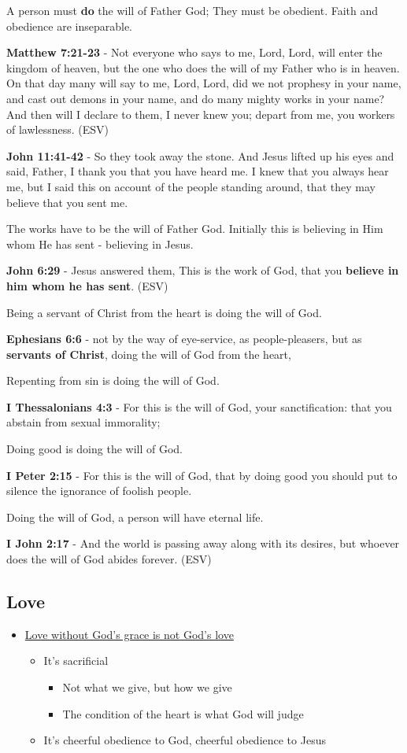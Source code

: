 \documentclass[11pt]{article}
\begin{document}
A person must \textbf{do} the will of Father God; They must be obedient.
Faith and obedience are inseparable.

\textbf{Matthew 7:21-23} - Not everyone who says to me, Lord, Lord, will enter the kingdom of heaven, but the one who does the will of my Father who is in heaven. On that day many will say to me, Lord, Lord, did we not prophesy in your name, and cast out demons in your name, and do many mighty works in your name? And then will I declare to them, I never knew you; depart from me, you workers of lawlessness. (ESV)

\textbf{John 11:41-42} - So they took away the stone. And Jesus lifted up his eyes and said, Father, I thank you that you have heard me. I knew that you always hear me, but I said this on account of the people standing around, that they may believe that you sent me.

The works have to be the will of Father God. Initially this is believing in Him whom He has sent - believing in Jesus.

\textbf{John 6:29} - Jesus answered them, This is the work of God, that you \textbf{believe in him whom he has sent}. (ESV)

Being a servant of Christ from the heart is doing the will of God.

\textbf{Ephesians 6:6} - not by the way of eye-service, as people-pleasers, but as \textbf{servants of Christ}, doing the will of God from the heart,

Repenting from sin is doing the will of God.

\textbf{I Thessalonians 4:3} - For this is the will of God, your sanctification: that you abstain from sexual immorality;

Doing good is doing the will of God.

\textbf{I Peter 2:15} - For this is the will of God, that by doing good you should put to silence the ignorance of foolish people.

Doing the will of God, a person will have eternal life.

\textbf{I John 2:17} - And the world is passing away along with its desires, but whoever does the will of God abides forever. (ESV)

\subsection{Love}
\label{sec:org2d36ddf}
\begin{itemize}
\item \href{https://www.youtube.com/watch?v=d2FKSxaa76w\&ab\_channel=FatherSpyridon}{Love without God's grace is not God's love}
\begin{itemize}
\item It's sacrificial
\begin{itemize}
\item Not what we give, but how we give
\item The condition of the heart is what God will judge
\end{itemize}
\item It's cheerful obedience to God, cheerful obedience to Jesus
\end{itemize}
\end{itemize}
\end{document}
